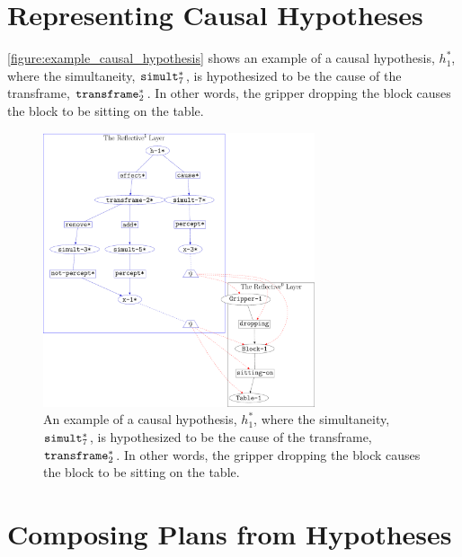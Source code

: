 \section{Representing Causal Hypotheses}

{\mbox{\autoref{figure:example_causal_hypothesis}}} shows an example
of a causal hypothesis, $h_1^*$, where the simultaneity,
$\text{\tt{simult}}_7^*$, is hypothesized to be the cause of the
transframe, $\text{\tt{transframe}}_2^*$.  In other words, the gripper
dropping the block causes the block to be sitting on the table.
\begin{figure}
\center
\includegraphics[width=8cm]{gfx/example_causal_hypothesis}
\caption[An example of a causal hypothesis.]{An example of a causal
  hypothesis, $h_1^*$, where the simultaneity,
  $\text{\tt{simult}}_7^*$, is hypothesized to be the cause of the
  transframe, $\text{\tt{transframe}}_2^*$.  In other words, the
  gripper dropping the block causes the block to be sitting on the
  table.}
\label{figure:example_causal_hypothesis}
\end{figure}

\section{Composing Plans from Hypotheses}

